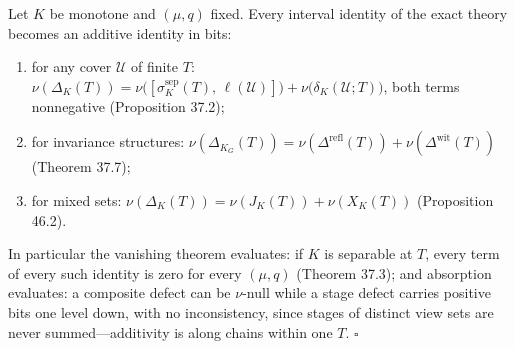 \begin{thmplain}

Let \(K\) be monotone and \((\mu, q)\) fixed. Every interval identity of the exact theory becomes an additive identity in bits:

\begin{enumerate}
\def\labelenumi{\arabic{enumi}.}
\tightlist
\item
  for any cover \(\mathcal{U}\) of finite \(T\): \(\nu(\Delta_K(T)) = \nu\big([\sigma^{\mathrm{sep}}_K(T),\, \ell(\mathcal{U})]\big) + \nu\big(\delta_K(\mathcal{U}; T)\big)\), both terms nonnegative (Proposition 37.2);
\item
  for invariance structures: \(\nu(\Delta_{K_G}(T)) = \nu(\Delta^{\mathrm{refl}}(T)) + \nu(\Delta^{\mathrm{wit}}(T))\) (Theorem 37.7);
\item
  for mixed sets: \(\nu(\Delta_K(T)) = \nu(J_K(T)) + \nu(X_K(T))\) (Proposition 46.2).
\end{enumerate}

In particular the vanishing theorem evaluates: if \(K\) is separable at \(T\), every term of every such identity is zero for every \((\mu, q)\) (Theorem 37.3); and absorption evaluates: a composite defect can be \(\nu\)-null while a stage defect carries positive bits one level down, with no inconsistency, since stages of distinct view sets are never summed---\hspace{0pt}additivity is along chains within one \(T\). \(\square\)
\end{thmplain}


